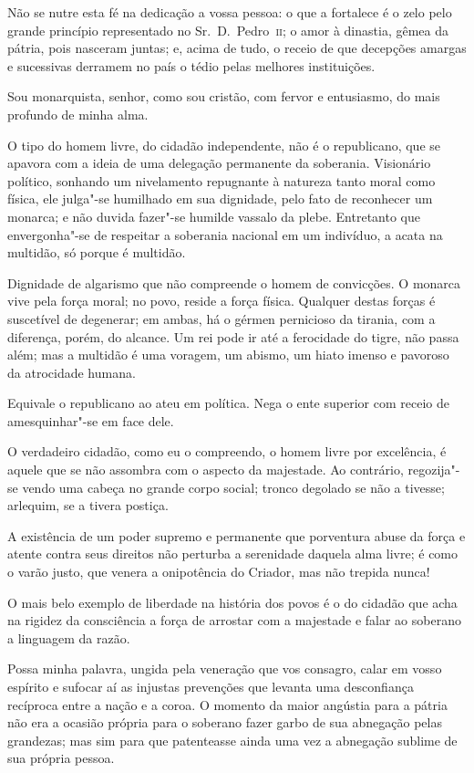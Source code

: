 Não se nutre esta fé na dedicação a vossa pessoa: o que a fortalece é o
zelo pelo grande princípio representado no Sr.~D.~Pedro~\textsc{ii}; o amor à
dinastia, gêmea da pátria, pois nasceram juntas; e, acima de tudo, o
receio de que decepções amargas e sucessivas derramem no país o tédio
pelas melhores instituições.

Sou monarquista, senhor, como sou cristão, com fervor e entusiasmo, do
mais profundo de minha alma.

O tipo do homem livre, do cidadão independente, não é o republicano, que
se apavora com a ideia de uma delegação permanente da soberania.
Visionário político, sonhando um nivelamento repugnante à natureza
tanto moral como física, ele julga"-se humilhado em sua dignidade,
pelo fato de reconhecer um monarca; e não duvida fazer"-se humilde
vassalo da plebe. Entretanto que envergonha"-se de respeitar a
soberania nacional em um indivíduo, a acata na multidão, só porque é multidão.

Dignidade de algarismo que não compreende o homem de convicções. O
monarca vive pela força moral; no povo, reside a força física. Qualquer
destas forças é suscetível de degenerar; em ambas, há o gérmen
pernicioso da tirania, com a diferença, porém, do alcance. Um rei pode
ir até a ferocidade do tigre, não passa além; mas a multidão é uma
voragem, um abismo, um hiato imenso e pavoroso da atrocidade humana. 

Equivale o republicano ao ateu em política. Nega o ente superior com
receio de amesquinhar"-se em face dele.

O verdadeiro cidadão, como eu o compreendo, o homem livre por
excelência, é aquele que se não assombra com o aspecto da majestade. Ao
contrário, regozija"-se vendo uma cabeça no grande corpo social;
tronco degolado se não a tivesse; arlequim, se a tivera postiça. 

A existência de um poder supremo e permanente que porventura abuse da
força e atente contra seus direitos não perturba a serenidade daquela
alma livre; é como o varão justo, que venera a onipotência do Criador,
mas não trepida nunca!

O mais belo exemplo de liberdade na história dos povos é o do cidadão
que acha na rigidez da consciência a força de arrostar com a majestade
e falar ao soberano a linguagem da razão.

Possa minha palavra, ungida pela veneração que vos consagro, calar em
vosso espírito e sufocar aí as injustas prevenções que levanta uma
desconfiança recíproca entre a nação e a coroa. O momento da maior
angústia para a pátria não era a ocasião própria para o soberano fazer
garbo de sua abnegação pelas grandezas; mas sim para que patenteasse
ainda uma vez a abnegação sublime de sua própria pessoa.

